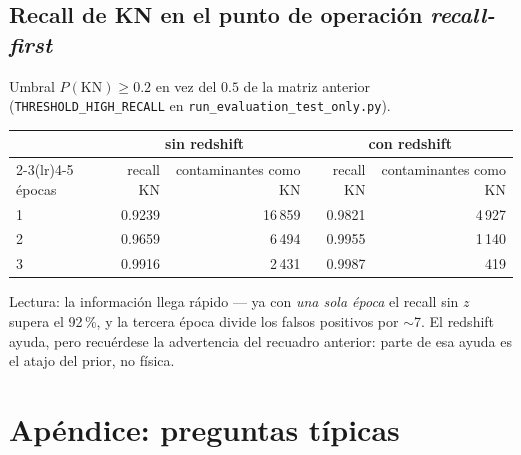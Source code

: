 \documentclass[11pt,a4paper]{article}
\newcommand{\code}[1]{\texttt{\small #1}}
\begin{document}
\subsection{Recall de KN en el punto de operación \emph{recall-first}}
Umbral $P(\mathrm{KN}) \ge 0.2$ en vez del $0.5$ de la matriz anterior
(\code{THRESHOLD\_HIGH\_RECALL} en \code{run\_evaluation\_test\_only.py}).
\begin{center}
\begin{tabular}{lrrrr}
\toprule
 & \multicolumn{2}{c}{sin redshift} & \multicolumn{2}{c}{con redshift} \\
\cmidrule(lr){2-3}\cmidrule(lr){4-5}
épocas & recall KN & contaminantes como KN & recall KN & contaminantes como KN \\
\midrule
1 & 0.9239 & 16\,859 & 0.9821 & 4\,927 \\
2 & 0.9659 &  6\,494 & 0.9955 & 1\,140 \\
3 & 0.9916 &  2\,431 & 0.9987 &   419 \\
\bottomrule
\end{tabular}
\end{center}

Lectura: la información llega rápido --- ya con \emph{una sola época} el recall sin $z$ supera el
92\,\%, y la tercera época divide los falsos positivos por $\sim$7. El redshift ayuda, pero
recuérdese la advertencia del recuadro anterior: parte de esa ayuda es el atajo del prior, no
física.

\section{Apéndice: preguntas típicas}
\end{document}
